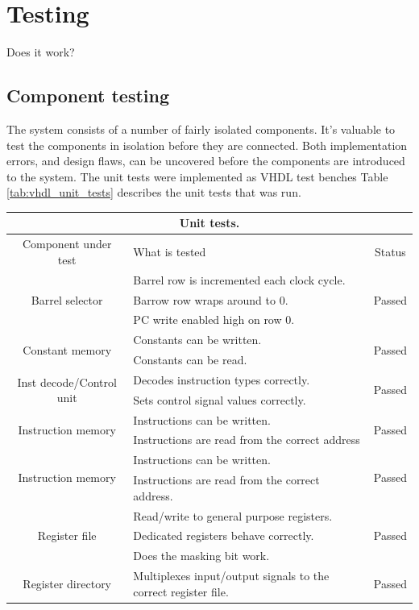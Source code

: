 \documentclass[../main/report.tex]{subfiles}
\begin{document}
\chapter{Testing}

Does it work?


\section{Component testing}
The system consists of a number of fairly isolated components.
It's valuable to test the components in isolation before they are connected.
Both implementation errors, and design flaws, can be uncovered before the components are introduced to the system.
The unit tests were implemented as VHDL test benches
Table \ref{tab:vhdl_unit_tests} describes the unit tests that was run.
\begin{table}[H]
	\centering
	\begin{tabularx}{\textwidth}{|c|X|c|}
	\hline
	\multicolumn{3}{|c|}{Unit tests.} \\
	\hline  Component under test & What is tested  	  & Status \\ 
	\hline  \multirow{3}{*}{Barrel selector} 		  & Barrel row is incremented each clock cycle.  & \multirow{3}{*}{ Passed } \\
	 										 		  & Barrow row wraps around to 0. & \\			
	 										 		  & PC write enabled high on row 0.& \\								
	\hline  \multirow{2}{*}{Constant memory} 	      & Constants can be written.  & \multirow{2}{*}{ Passed } \\
	 										 		  & Constants can be read. & \\												
	\hline \multirow{2}{*}{Inst decode/Control unit}  & Decodes instruction types correctly. & \multirow{2}{*}{ Passed } \\
		   											  & Sets control signal values correctly. &\\
	\hline \multirow{2}{*}{Instruction memory} 		  & Instructions can be written. & \multirow{2}{*}{ Passed } \\
													  & Instructions are read from the correct address  & \\ 
	\hline \multirow{2}{*}{Instruction memory} 		  & Instructions can be written. & \multirow{2}{*}{ Passed } \\
													  & Instructions are read from the correct address.  & \\ 
	\hline \multirow{3}{*}{Register file} 		  	  & Read/write to general purpose registers. & \multirow{3}{*}{ Passed } \\
													  & Dedicated registers behave correctly.  & \\ 
													  & Does the masking bit work.  & \\ 													  
	\hline  Register directory 		 				  & Multiplexes input/output signals to the correct register file. & Passed  \\
	

\end{tabularx}
\end{table}
\end{document}
